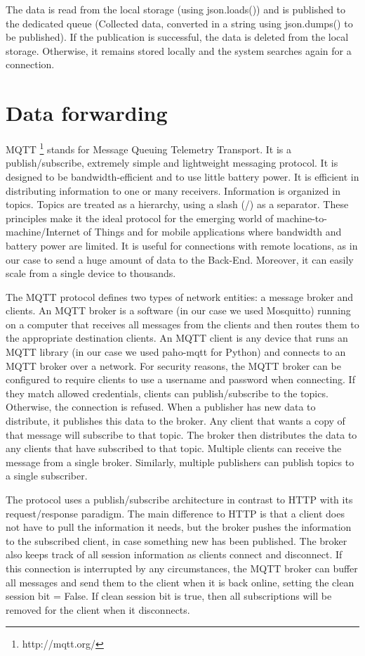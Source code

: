 The data is read from the local storage (using json.loads()) and is published to the dedicated queue (Collected data, converted in a string using json.dumps() to be published). 
If the publication is successful, the data is deleted from the local storage. Otherwise, it remains stored locally and the system searches again for a connection.


\section{Data forwarding}
\label{sec:forward}
\vspace{0.2 cm} 

MQTT \footnote{http://mqtt.org/} stands for Message Queuing Telemetry Transport. It is a publish/subscribe, extremely simple and lightweight messaging protocol. It is designed to be bandwidth-efficient and to use little battery power. It is efficient in distributing information to one or many receivers. Information is organized in topics. Topics are treated as a hierarchy, using a slash (/) as a separator. These principles make it the ideal protocol for the emerging world of machine-to-machine/Internet of Things and for mobile applications where bandwidth and battery power are limited. It is useful for connections with remote locations, as in our case to send a huge amount of data to the Back-End. Moreover, it can easily scale from a single device to thousands.

The MQTT protocol defines two types of network entities: a message broker and clients. An MQTT broker is a software (in our case we used Mosquitto) running on a computer that receives all messages from the clients and then routes them to the appropriate destination clients. An MQTT client is any device that runs an MQTT library (in our case we used paho-mqtt for Python) and connects to an MQTT broker over a network.
For security reasons, the MQTT broker can be configured to require clients to use a username and password when connecting. If they match allowed credentials, clients can publish/subscribe to the topics. Otherwise, the connection is refused.
When a publisher has new data to distribute, it publishes this data to the broker. Any client that wants a copy of that message will subscribe to that topic. The broker then distributes the data to any clients that have subscribed to that topic. Multiple clients can receive the message from a single broker. Similarly, multiple publishers can publish topics to a single subscriber.

The protocol uses a publish/subscribe architecture in contrast to HTTP with its request/response paradigm. The main difference to HTTP is that a client does not have to pull the information it needs, but the broker pushes the information to the subscribed client, in case something new has been published. The broker also keeps track of all session information as clients connect and disconnect. If this connection is interrupted by any circumstances, the MQTT broker can buffer all messages and send them to the client when it is back online, setting the clean session bit = False. If clean session bit is true, then all subscriptions will be removed for the client when it disconnects.


